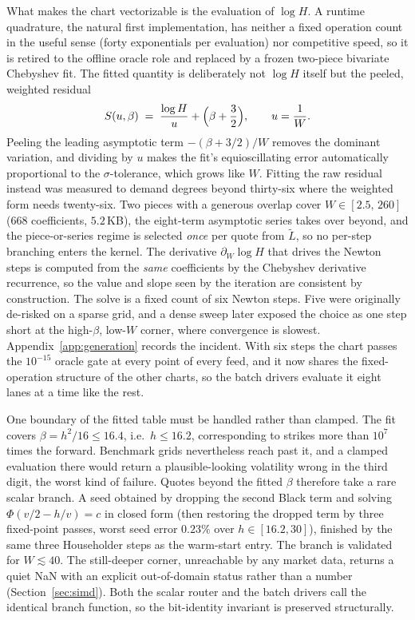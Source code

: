 \documentclass[11pt]{article}
\newcommand{\PhiN}{\Phi}
\begin{document}
What makes the chart vectorizable is the evaluation of $\log H$. A runtime quadrature, the natural first implementation, has neither a fixed operation count in the useful sense (forty exponentials per evaluation) nor competitive speed, so it is retired to the offline oracle role and replaced by a frozen two-piece bivariate Chebyshev fit. The fitted quantity is deliberately not $\log H$ itself but the peeled, weighted residual
\begin{equation}
  S(u,\beta)\;=\;\frac{\log H}{u}+\Bigl(\beta+\frac32\Bigr),\qquad u=\frac1W.
\end{equation}
Peeling the leading asymptotic term $-(\beta+3/2)/W$ removes the dominant variation, and dividing by $u$ makes the fit's equioscillating error automatically proportional to the $\sigma$-tolerance, which grows like $W$. Fitting the raw residual instead was measured to demand degrees beyond thirty-six where the weighted form needs twenty-six. Two pieces with a generous overlap cover $W\in[2.5,\,260]$ ($668$ coefficients, $5.2$\,KB), the eight-term asymptotic series takes over beyond, and the piece-or-series regime is selected \emph{once} per quote from $\widetilde L$, so no per-step branching enters the kernel. The derivative $\partial_W\log H$ that drives the Newton steps is computed from the \emph{same} coefficients by the Chebyshev derivative recurrence, so the value and slope seen by the iteration are consistent by construction. The solve is a fixed count of six Newton steps. Five were originally de-risked on a sparse grid, and a dense sweep later exposed the choice as one step short at the high-$\beta$, low-$W$ corner, where convergence is slowest. Appendix~\ref{app:generation} records the incident. With six steps the chart passes the $10^{-15}$ oracle gate at every point of every feed, and it now shares the fixed-operation structure of the other charts, so the batch drivers evaluate it eight lanes at a time like the rest.

One boundary of the fitted table must be handled rather than clamped. The fit covers $\beta=h^2/16\le16.4$, i.e.\ $h\le16.2$, corresponding to strikes more than $10^{7}$ times the forward. Benchmark grids nevertheless reach past it, and a clamped evaluation there would return a plausible-looking volatility wrong in the third digit, the worst kind of failure. Quotes beyond the fitted $\beta$ therefore take a rare scalar branch. A seed obtained by dropping the second Black term and solving $\PhiN(v/2-h/v)=c$ in closed form (then restoring the dropped term by three fixed-point passes, worst seed error $0.23\%$ over $h\in[16.2,30]$), finished by the same three Householder steps as the warm-start entry. The branch is validated for $W\lesssim40$. The still-deeper corner, unreachable by any market data, returns a quiet NaN with an explicit out-of-domain status rather than a number (Section~\ref{sec:simd}). Both the scalar router and the batch drivers call the identical branch function, so the bit-identity invariant is preserved structurally.
\end{document}
